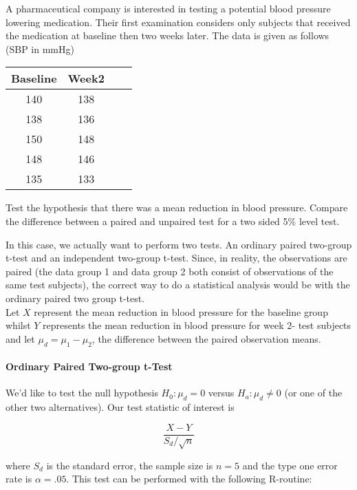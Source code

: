 \documentclass{homework}
\begin{document}
\begin{tcolorbox}[title=Question 2]
A pharmaceutical company is interested in testing a potential blood pressure lowering medication. Their first examination considers only subjects that received the medication at baseline then two weeks later. The data
is given as follows (SBP in mmHg)

\begin{center}
\begin{tabular}{ |c|c|c|c| } 
\hline
 Baseline & Week2 \\ [0.5ex] 
 \hline
 140 & 138 \\ 
 138 & 136 \\
 150 & 148 \\
 148 & 146 \\
 135 & 133 \\ [1ex] 
 \hline
\end{tabular}
\end{center}

Test the hypothesis that there was a mean reduction in blood pressure. Compare the difference between a paired and unpaired test for a two sided 5\% level test.
\end{tcolorbox}

In this case, we actually want to perform two tests. An ordinary paired two-group t-test and an independent two-group t-test. Since, in reality, the observations are paired (the data group 1 and data group 2 both consist of observations of the same test subjects), the correct way to do a statistical analysis would be with the ordinary paired two group t-test. \\

Let $X$ represent the mean reduction in blood pressure for the baseline group whilst $Y$ represents the mean reduction in blood pressure for week 2- test subjects and let $\mu_d = \mu_1-\mu_2$, the difference between the paired observation means.

\paragraph{\textbf{Ordinary Paired Two-group t-Test}} We'd like to test the null hypothesis $H_0: \mu_d = 0$ versus $H_a: \mu_d \neq 0$ (or one of the other two alternatives). Our test statistic of interest is 

$$\frac{X-Y}{S_d/\sqrt{n}}$$

where $S_d$ is the standard error, the sample size is $n=5$ and the type one error rate is $\alpha = .05$. This test can be performed with the following R-routine:
\end{document}
